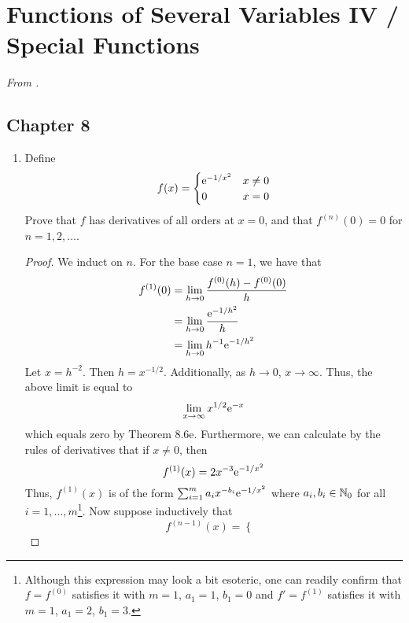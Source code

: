 \documentclass[../psets.tex]{subfiles}
\begin{document}
\section{Functions of Several Variables IV / Special Functions}
\emph{From \textcite{bib:Rudin}.}
\subsection*{Chapter 8}
\begin{enumerate}[label={\textbf{\arabic*.}}]
    \item {}Define
    \begin{equation*}
        f(x) =
        \begin{cases}
            \e[-1/x^2] & x\neq 0\\
            0 & x=0
        \end{cases}
    \end{equation*}
    Prove that $f$ has derivatives of all orders at $x=0$, and that $f^{(n)}(0)=0$ for $n=1,2,\dots$.
    \begin{proof}
        We induct on $n$. For the base case $n=1$, we have that
        \begin{align*}
            f^{(1)}(0) &= \lim_{h\to 0}\frac{f^{(0)}(h)-f^{(0)}(0)}{h}\\
            &= \lim_{h\to 0}\frac{\e[-1/h^2]}{h}\\
            &= \lim_{h\to 0}h^{-1}\e[-1/h^2]
        \end{align*}
        Let $x=h^{-2}$. Then $h=x^{-1/2}$. Additionally, as $h\to 0$, $x\to\infty$. Thus, the above limit is equal to
        \begin{equation*}
            \lim_{x\to\infty}x^{1/2}\e[-x]
        \end{equation*}
        which equals zero by Theorem 8.6e. Furthermore, we can calculate by the rules of derivatives that if $x\neq 0$, then
        \begin{equation*}
            f^{(1)}(x) = 2x^{-3}\e[-1/x^2]
        \end{equation*}
        Thus, $f^{(1)}(x)$ is of the form $\sum_{i=1}^ma_ix^{-b_i}\e[-1/x^2]$ where $a_i,b_i\in\N_0$ for all $i=1,\dots,m$\footnote{Although this expression may look a bit esoteric, one can readily confirm that $f=f^{(0)}$ satisfies it with $m=1$, $a_1=1$, $b_1=0$ and $f'=f^{(1)}$ satisfies it with $m=1$, $a_1=2$, $b_1=3$.}. Now suppose inductively that
        \begin{equation*}
            f^{(n-1)}(x) =
            \begin{cases}

\end{cases}
\end{equation*}
\end{proof}
\end{enumerate}
\end{document}
